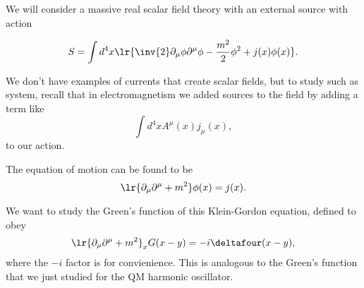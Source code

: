 We will consider a massive real scalar field theory with an external source with action

\begin{dmath}\label{eqn:qftLecture11:680}
S = \int d^4 x \lr{
\inv{2} \partial_\mu \phi \partial^\mu \phi - \frac{m^2}{2} \phi^2 + j(x) \phi(x)
}.
\end{dmath}

We don't have examples of currents that create scalar fields, but to study such as system, recall that
in electromagnetism we added sources to the field by adding a term like
\begin{dmath}\label{eqn:qftLecture11:700}
\int d^4 x A^\mu(x) j_\mu(x),
\end{dmath}
to our action.

The equation of motion can be found to be
\begin{dmath}\label{eqn:qftLecture11:720}
\lr{ \partial_\mu \partial^\mu + m^2 } \phi(x) = j(x).
\end{dmath}

We want to study the Green's function of this Klein-Gordon equation, defined to obey
\begin{dmath}\label{eqn:qftLecture11:740}
\lr{ \partial_\mu \partial^\mu + m^2 }_x G(x - y) = -i \deltafour(x - y),
\end{dmath}
where the \( -i \) factor is for convienience.
This is analogous to the Green's function that we just studied for the QM harmonic oscillator.



